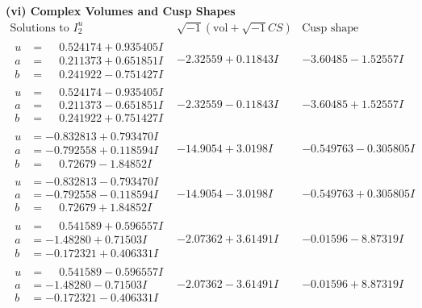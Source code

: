 \documentclass[1p]{elsarticle_modified}
\theoremstyle{definition}
\newcommand{\I}{\sqrt{-1}}
\begin{document}
\newpage\flushleft \textbf{(vi) Complex Volumes and Cusp Shapes}
$$\begin{array}{c|c|c}  
\text{Solutions to }I^u_{2}& \I (\text{vol} + \sqrt{-1}CS) & \text{Cusp shape}\\
 \hline 
\begin{aligned}
u &= \phantom{-}0.524174 + 0.935405 I \\
a &= \phantom{-}0.211373 + 0.651851 I \\
b &= \phantom{-}0.241922 - 0.751427 I\end{aligned}
 & -2.32559 + 0.11843 I & -3.60485 - 1.52557 I \\ \hline\begin{aligned}
u &= \phantom{-}0.524174 - 0.935405 I \\
a &= \phantom{-}0.211373 - 0.651851 I \\
b &= \phantom{-}0.241922 + 0.751427 I\end{aligned}
 & -2.32559 - 0.11843 I & -3.60485 + 1.52557 I \\ \hline\begin{aligned}
u &= -0.832813 + 0.793470 I \\
a &= -0.792558 + 0.118594 I \\
b &= \phantom{-}0.72679 - 1.84852 I\end{aligned}
 & -14.9054 + 3.0198 I & -0.549763 - 0.305805 I \\ \hline\begin{aligned}
u &= -0.832813 - 0.793470 I \\
a &= -0.792558 - 0.118594 I \\
b &= \phantom{-}0.72679 + 1.84852 I\end{aligned}
 & -14.9054 - 3.0198 I & -0.549763 + 0.305805 I \\ \hline\begin{aligned}
u &= \phantom{-}0.541589 + 0.596557 I \\
a &= -1.48280 + 0.71503 I \\
b &= -0.172321 + 0.406331 I\end{aligned}
 & -2.07362 + 3.61491 I & -0.01596 - 8.87319 I \\ \hline\begin{aligned}
u &= \phantom{-}0.541589 - 0.596557 I \\
a &= -1.48280 - 0.71503 I \\
b &= -0.172321 - 0.406331 I\end{aligned}
 & -2.07362 - 3.61491 I & -0.01596 + 8.87319 I \\ \hline\begin{aligned}

\end{aligned}
\end{array}$$
\end{document}
